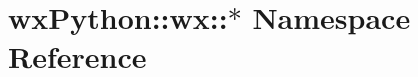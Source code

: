 \hypertarget{namespacewxPython_1_1wx_1_1_5}{
\section{wx\-Python::wx::$\ast$ Namespace Reference}
\label{namespacewxPython_1_1wx_1_1_5}
}


